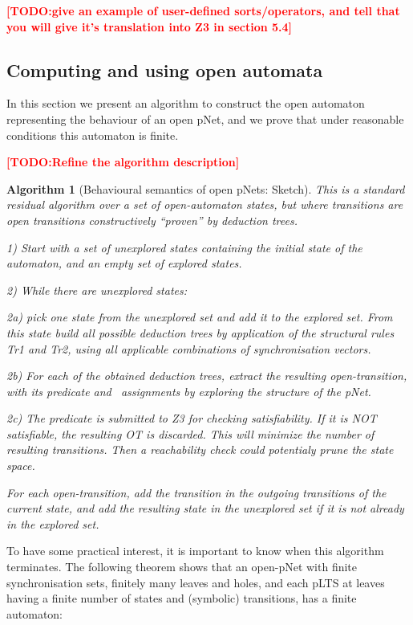 \documentclass{lncs/llncs}
\newcommand{\TODO}[1]{\textcolor{red}{\textbf{[TODO:#1]}}}
\newcommand{\Post}{\symb{Post}}
\newtheorem{alg}[theorem]{Algorithm}
\begin{document}
\TODO{give an example of user-defined sorts/operators, and tell that
  you will give it's translation into Z3 in section 5.4}

\subsection{Computing and using open automata}
In this section we present an algorithm to construct the open
automaton representing the behaviour of an open pNet, and we prove that
under reasonable conditions this automaton is finite.

\TODO{Refine the algorithm description}

\begin{alg}[Behavioural semantics of open pNets: Sketch]
This is a standard residual algorithm over a set of open-automaton
states, but where transitions are open transitions
constructively ``proven'' by deduction trees.

1) Start with a set of unexplored states containing the initial state
of the automaton, and an empty set of explored states.

2) While there are unexplored states:

2a) pick one state from the unexplored set and add it to the explored
set. From this state
build all possible deduction trees by application of the structural
rules Tr1 and Tr2, using all applicable combinations
of synchronisation vectors.

2b) For each of the obtained deduction trees, extract the resulting
open-transition, with its predicate and \Post\ assignments by exploring the structure of 
the pNet.

2c)
The predicate is submitted to Z3 for checking satisfiability. If it is
NOT satisfiable, the resulting OT is discarded. This will minimize the
number of 
resulting transitions. Then a reachability check could potentialy
prune the state space.

For each open-transition,  add the transition in the outgoing transitions of
the current state, and add the
resulting state in the unexplored set if it is not already in the
explored set.

\end{alg}



To have some practical interest, it is important to know when this
algorithm terminates. The following theorem shows that an open-pNet
with finite synchronisation sets, finitely many leaves and
holes, and each pLTS at leaves having a finite number of states and
(symbolic) transitions, has a finite automaton:
\end{document}
